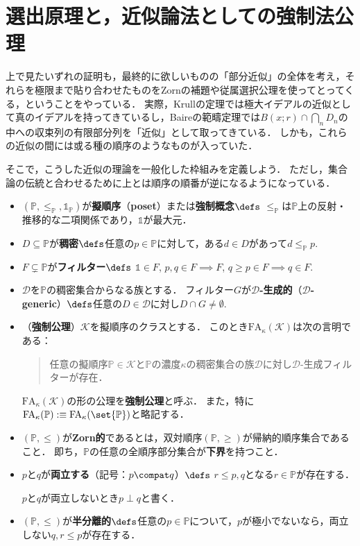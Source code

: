 \documentclass[a4j,leqno]{ltjsarticle}
\newcommand{\FA}{\mathrm{FA}}
\renewcommand{\emph}[1]{\textbf{\textsf{#1}}}
\begin{document}
\section{選出原理と，近似論法としての強制法公理}
上で見たいずれの証明も，最終的に欲しいものの「部分近似」の全体を考え，それらを極限まで貼り合わせたものをZornの補題や従属選択公理を使ってとってくる，ということをやっている．
実際，Krullの定理では極大イデアルの近似として真のイデアルを持ってきているし，Baireの範疇定理では$B(x; r) \cap \bigcap_n D_n$の中への収束列の有限部分列を「近似」として取ってきている．
しかも，これらの近似の間には或る種の順序のようなものが入っていた．

そこで，こうした近似の理論を一般化した枠組みを定義しよう．
ただし，集合論の伝統と合わせるために上とは順序の順番が逆になるようになっている．
\begin{definition}
 \begin{itemize}
  \item $(\mathbb{P}, {\leq}_{\mathbb{P}}, \mathds{1}_{\mathbb{P}})$が\emph{擬順序}（\emph{poset}）または\emph{強制概念}$\defs$ $\leq_{\mathbb{P}}$は$\mathbb{P}$上の反射・推移的な二項関係であり，$\mathds{1}$が最大元．
  \item $D \subseteq \mathbb{P}$が\emph{稠密}$\defs$任意の$p \in \mathbb{P}$に対して，ある$d \in D$があって$d \leq_{\mathbb{P}} p$.
  \item $F \subsetneq \mathbb{P}$が\emph{フィルター}$\defs$ $\mathds{1} \in F$, $p, q \in F \implies F$, $q \geq p \in F \implies q \in F$.
  \item $\mathcal{D}$を$\mathbb{P}$の稠密集合からなる族とする．
        フィルター$G$が\emph{$\mathcal{D}$-生成的}（\emph{$\mathcal{D}$-generic}）$\defs$任意の$D \in \mathcal{D}$に対し$D \cap G \neq \emptyset$.
  \item （\emph{強制公理}）$\mathcal{K}$を擬順序のクラスとする．
        このとき$\FA_\kappa(\mathcal{K})$は次の言明である：

        \begin{quotation}
         任意の擬順序$\mathbb{P} \in \mathcal{K}$と$\mathbb{P}$の濃度$\kappa$の稠密集合の族$\mathcal{D}$に対し$\mathcal{D}$-生成フィルターが存在．
        \end{quotation}

        $\FA_\kappa(\mathcal{K})$の形の公理を\emph{強制公理}と呼ぶ．
        また，特に$\FA_\kappa(\mathbb{P}) \mathrel{{:}{\equiv}} \FA_\kappa(\set{\mathbb{P}})$と略記する．
  \item $(\mathbb{P}, \leq)$が\emph{Zorn的}であるとは，双対順序$(\mathbb{P}, \geq)$が帰納的順序集合であること．
        即ち，$\mathbb{P}$の任意の全順序部分集合が\emph{下界}を持つこと．
  \item $p$と$q$が\emph{両立する}（記号：$p \compat q$）$\defs$ $r \leq p, q$となる$r \in \mathbb{P}$が存在する．

        $p$と$q$が両立しないとき$p \perp q$と書く．
  \item $(\mathbb{P}, \leq)$が\emph{半分離的}$\defs$任意の$p \in \mathbb{P}$について，$p$が極小でないなら，両立しない$q, r \leq p$が存在する．
 \end{itemize}
\end{definition}
\end{document}
